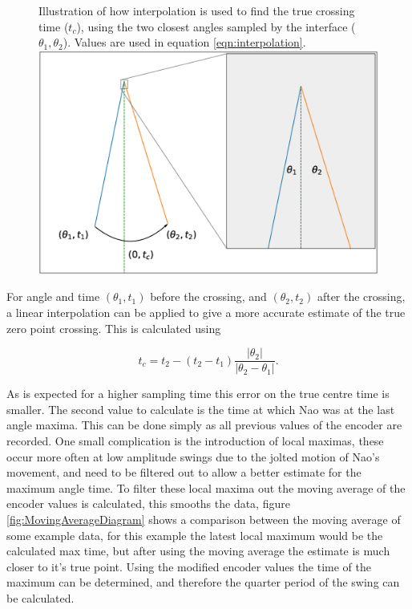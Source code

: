 \documentclass[11pt]{article}
\begin{document}
    \begin{figure}[!htb]
        \centering
        \captionbox
             {Illustration of how interpolation is used to find the true crossing time ($t_c$), using the two closest angles sampled by the interface ($\theta_1, \theta_2$). Values are used in equation \ref{eqn:interpolation}. \label{fig:InterpolationDiagram}}
             {\includegraphics[width=1.0\textwidth]{InterpolationDiagram.eps}}
    \end{figure}

For angle and time $(\theta_1, t_1)$ before the crossing, and $(\theta_2, t_2)$ after the crossing, a linear interpolation can be applied to give a more accurate estimate of the true zero point crossing. This is calculated using

\begin{equation}
    t_c = t_2 - (t_2 - t_1) \frac{|\theta_2|}{|\theta_2 - \theta_1|}.\label{eqn:interpolation}
\end{equation}

As is expected for a higher sampling time this error on the true centre time is smaller. The second value to calculate is the time at which Nao was at the last angle maxima. This can be done simply as all previous values of the encoder are recorded. One small complication is the introduction of local maximas, these occur more often at low amplitude swings due to the jolted motion of Nao's movement, and need to be filtered out to allow a better estimate for the maximum angle time. To filter these local maxima out the moving average of the encoder values is calculated, this smooths the data, figure \ref{fig:MovingAverageDiagram} shows a comparison between the moving average of some example data, for this example the latest local maximum would be the calculated max time, but after using the moving average the estimate is much closer to it's true point. Using the modified encoder values the time of the maximum can be determined, and therefore the quarter period of the swing can be calculated. \\
\end{document}
